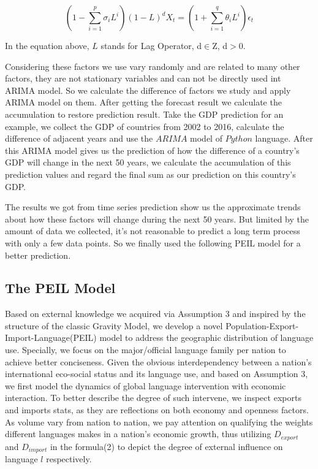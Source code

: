\documentclass{mcmthesis}
\begin{document}
    \begin{equation}
      \left(1-\sum^p_{i=1}\sigma_i L^i\right)(1-L)^d X_t = \left(1+\sum^q_{i=1}\theta_i L^i\right)\epsilon_t
    \end{equation}
  
    \indent In the equation above, $L$ stands for Lag Operator, d$\in$Z, d$>$0.
  
    \indent Considering these factors we use vary randomly and are related to many other factors, they are not stationary variables and can not be directly used int ARIMA model. So we calculate the difference of factors we study and apply ARIMA model on them. After getting the forecast result we calculate the accumulation to restore prediction result. Take the GDP prediction for an example, we collect the GDP of countries from 2002 to 2016, calculate the difference of adjacent years and use the $ARIMA$ model of $Python$ language. After this ARIMA model gives us the prediction of how the difference of a country's GDP will change in the next 50 years, we calculate the accumulation of this prediction values and regard the final sum as our prediction on this country's GDP.
    
    \indent The results we got from time series prediction show us the approximate trends about how these factors will change during the next 50 years. But limited by the amount of data we collected, it's not reasonable to predict a long term process with only a few data points. So we finally used the following PEIL model for a better prediction.
  
  
  \subsection{The PEIL Model}
  \indent \indent Based on external knowledge we acquired via Assumption 3 and inspired by the structure of the classic Gravity Model, we  develop a novel Population-Export-Import-Language(PEIL) model to address the geographic distribution of language use. Specially, we focus on the major/official language family per nation to achieve better conciseness.
  \indent Given the obvious interdependency between a nation's international eco-social status and its language use, and based on Assumption 3, we first model the dynamics of global language intervention with economic interaction. To better describe the degree of such intervene, we inspect exports and imports stats, as they are reflections on both economy and openness factors. As volume vary from nation to nation, we pay attention on qualifying the weights different languages makes in a nation's economic growth, thus utilizing ${D_{export}}$ and ${D_{import}}$ in the formula(2) to depict the degree of external influence on language $l$ respectively.
  
\end{document}
